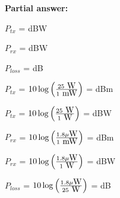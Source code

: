 





\noindent
{\bf Partial answer:}

\vskip 10pt

$P_{tx}$ =  dBW 

\vskip 10pt

$P_{rx}$ =  dBW 

\vskip 10pt

$P_{loss}$ =  dB








$P_{tx}$ = $10 \log \left( 25 \hbox { W} \over 1 \hbox{ mW} \right)$ =  dBm  

\vskip 10pt

$P_{tx}$ = $10 \log \left( 25 \hbox { W} \over 1 \hbox{ W} \right)$ =  dBW 

\vskip 10pt

$P_{rx}$ = $10 \log \left( 1.8 \mu \hbox {W} \over 1 \hbox{ mW} \right)$ =  dBm 

\vskip 10pt

$P_{rx}$ = $10 \log \left( 1.8 \mu \hbox {W} \over 1 \hbox{ W} \right)$ =  dBW 

\vskip 10pt

$P_{loss}$ = $10 \log \left( 1.8 \mu \hbox {W} \over 25 \hbox{ W} \right)$ =  dB




